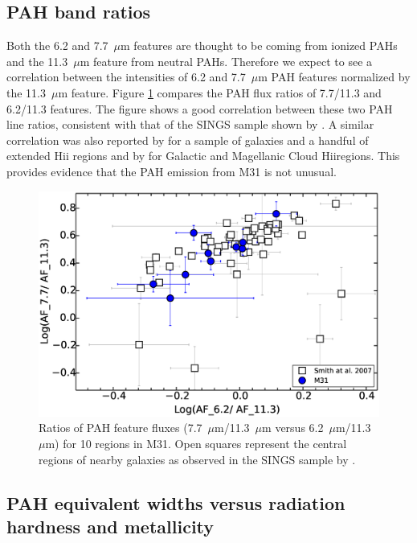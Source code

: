 
\subsection{PAH band ratios}
\label{sect:pah_ratios}

Both the 6.2 and 7.7~$\mu$m features are thought to be coming from ionized PAHs and the 11.3~$\mu$m feature from neutral PAHs. Therefore we expect to see a correlation between the intensities of 6.2 and 7.7~$\mu$m PAH features normalized by the 11.3~$\mu$m feature.  Figure \ref{PAHlines}  compares the PAH flux ratios of 7.7/11.3  and 6.2/11.3 features. The figure shows a good correlation between these two PAH line ratios, consistent with that of the SINGS sample shown by \citet{Smith:2007lr}.
A similar correlation was also reported by  \citet{Galliano2008} for a sample of galaxies and a handful of extended H{\sc ii} regions
and by \citet{Vermeij2002} for Galactic and Magellanic Cloud H{\sc ii}regions. This provides evidence that the PAH emission from M31 is not unusual. 


\begin{figure}
\centering
\includegraphics[scale = 0.4]{./fig8.eps}
\caption{Ratios of PAH feature fluxes (7.7~$\mu$m/11.3~$\mu$m versus 6.2~$\mu$m/11.3~$\mu$m) for 10 regions in M31.
Open squares represent the central regions of nearby galaxies as observed in the SINGS sample by \citet{Smith:2007lr}.
}
\label{PAHlines}
\end{figure}


\subsection{PAH equivalent widths versus radiation hardness and metallicity}
\label{sect:eqw_rh}

